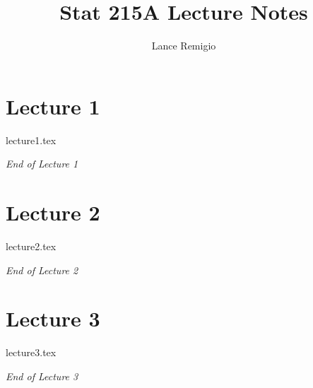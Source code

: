 \documentclass[a4paper]{article}
\title{Stat 215A Lecture Notes}
\author{Lance Remigio}
\begin{document}
\maketitle
\tableofcontents

\section{Lecture 1}

{lecture1.tex}

\begin{center}
    \textit{End of Lecture 1} 
\end{center}

\section{Lecture 2}

{lecture2.tex}

\begin{center}
    \textit{End of Lecture 2} 
\end{center}

\section{Lecture 3}


{lecture3.tex}

\begin{center}
    \textit{End of Lecture 3} 
\end{center}
\end{document}
